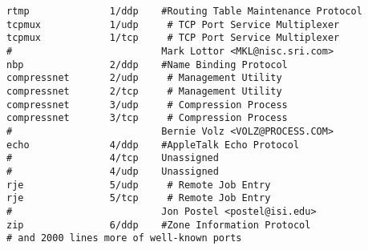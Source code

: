 \begin{verbatim}
rtmp              1/ddp    #Routing Table Maintenance Protocol
tcpmux            1/udp     # TCP Port Service Multiplexer
tcpmux            1/tcp     # TCP Port Service Multiplexer
#                          Mark Lottor <MKL@nisc.sri.com>
nbp               2/ddp    #Name Binding Protocol
compressnet       2/udp     # Management Utility
compressnet       2/tcp     # Management Utility
compressnet       3/udp     # Compression Process
compressnet       3/tcp     # Compression Process
#                          Bernie Volz <VOLZ@PROCESS.COM>
echo              4/ddp    #AppleTalk Echo Protocol
#                 4/tcp    Unassigned
#                 4/udp    Unassigned
rje               5/udp     # Remote Job Entry
rje               5/tcp     # Remote Job Entry
#                          Jon Postel <postel@isi.edu>
zip               6/ddp    #Zone Information Protocol
# and 2000 lines more of well-known ports
\end{verbatim}
